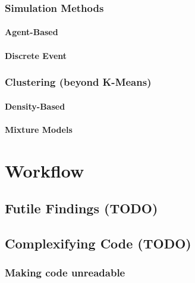 \documentclass[
]{krantz}
\begin{document}
\hypertarget{simulation-methods}{%
\section{Simulation Methods}\label{simulation-methods}}

\hypertarget{agent-based}{%
\subsection{Agent-Based}\label{agent-based}}

\hypertarget{discrete-event}{%
\subsection{Discrete Event}\label{discrete-event}}

\hypertarget{clustering-beyond-k-means}{%
\section{Clustering (beyond K-Means)}\label{clustering-beyond-k-means}}

\hypertarget{density-based}{%
\subsection{Density-Based}\label{density-based}}

\hypertarget{mixture-models}{%
\subsection{Mixture Models}\label{mixture-models}}

\hypertarget{part-workflow}{%
\part*{Workflow}\label{part-workflow}}


\hypertarget{futi-find}{%
\chapter{Futile Findings (TODO)}\label{futi-find}}

\hypertarget{comp-code}{%
\chapter{Complexifying Code (TODO)}\label{comp-code}}

\hypertarget{making-code-unreadable}{%
\section{Making code unreadable}\label{making-code-unreadable}}
\end{document}
